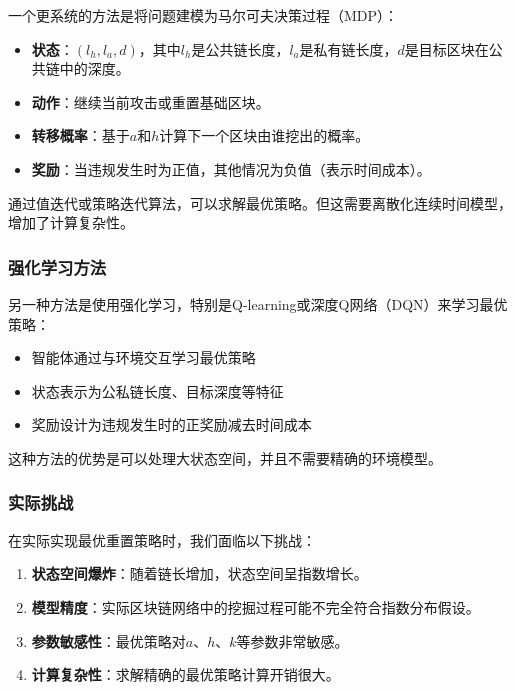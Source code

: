 \documentclass[12pt,a4paper]{article}
\begin{document}
\begin{CJK}{UTF8}{gbsn}
一个更系统的方法是将问题建模为马尔可夫决策过程（MDP）：

\begin{itemize}
    \item \textbf{状态}：$(l_h, l_a, d)$，其中$l_h$是公共链长度，$l_a$是私有链长度，$d$是目标区块在公共链中的深度。
    \item \textbf{动作}：继续当前攻击或重置基础区块。
    \item \textbf{转移概率}：基于$a$和$h$计算下一个区块由谁挖出的概率。
    \item \textbf{奖励}：当违规发生时为正值，其他情况为负值（表示时间成本）。
\end{itemize}

通过值迭代或策略迭代算法，可以求解最优策略。但这需要离散化连续时间模型，增加了计算复杂性。

\subsubsection{强化学习方法}

另一种方法是使用强化学习，特别是Q-learning或深度Q网络（DQN）来学习最优策略：

\begin{itemize}
    \item 智能体通过与环境交互学习最优策略
    \item 状态表示为公私链长度、目标深度等特征
    \item 奖励设计为违规发生时的正奖励减去时间成本
\end{itemize}

这种方法的优势是可以处理大状态空间，并且不需要精确的环境模型。

\subsubsection{实际挑战}

在实际实现最优重置策略时，我们面临以下挑战：

\begin{enumerate}
    \item \textbf{状态空间爆炸}：随着链长增加，状态空间呈指数增长。
    \item \textbf{模型精度}：实际区块链网络中的挖掘过程可能不完全符合指数分布假设。
    \item \textbf{参数敏感性}：最优策略对$a$、$h$、$k$等参数非常敏感。
    \item \textbf{计算复杂性}：求解精确的最优策略计算开销很大。
\end{enumerate}


\end{CJK}
\end{document}
